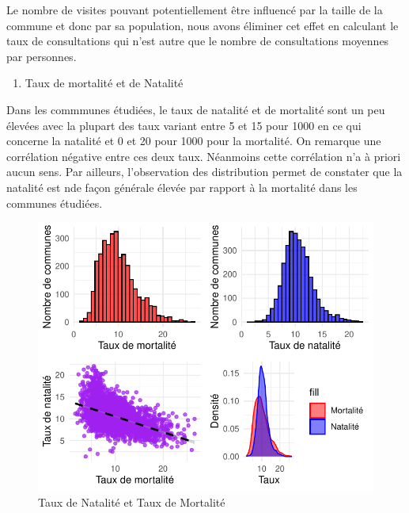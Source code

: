 \documentclass[
]{article}
\providecommand{\tightlist}{%
  \setlength{\itemsep}{0pt}\setlength{\parskip}{0pt}}
\begin{document}
Le nombre de visites pouvant potentiellement être influencé par la
taille de la commune et donc par sa population, nous avons éliminer cet
effet en calculant le taux de consultations qui n'est autre que le
nombre de consultations moyennes par personnes.

\begin{enumerate}
\def\labelenumi{\arabic{enumi}.}
\setcounter{enumi}{1}
\tightlist
\item
  Taux de mortalité et de Natalité
\end{enumerate}

Dans les commmunes étudiées, le taux de natalité et de mortalité sont un
peu élevées avec la plupart des taux variant entre 5 et 15 pour 1000 en
ce qui concerne la natalité et 0 et 20 pour 1000 pour la mortalité. On
remarque une corrélation négative entre ces deux taux. Néanmoins cette
corrélation n'a à priori aucun sens. Par ailleurs, l'observation des
distribution permet de constater que la natalité est nde façon générale
élevée par rapport à la mortalité dans les communes étudiées.

\begin{figure}

{\centering \includegraphics{rapport_intermediaire_files/figure-latex/unnamed-chunk-10-1} 

}

\caption{Taux de Natalité et Taux de Mortalité}\label{fig:unnamed-chunk-10}
\end{figure}
\end{document}
